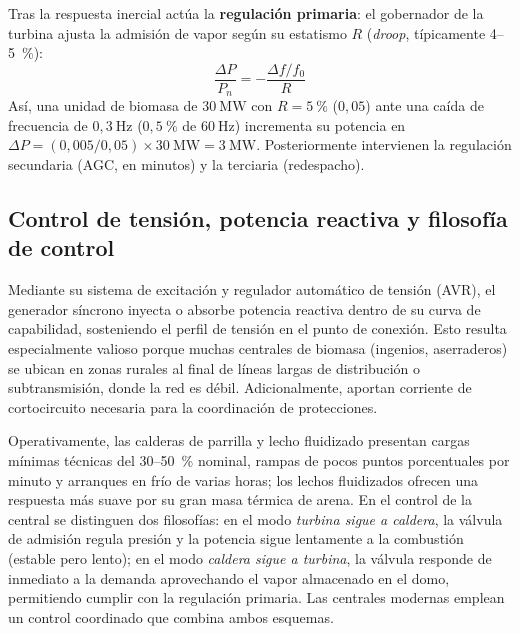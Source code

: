 Tras la respuesta inercial actúa la \textbf{regulación primaria}: el gobernador de la turbina ajusta la admisión de vapor según su estatismo $R$ (\textit{droop}, típicamente 4--5~\%):
\begin{equation}
\frac{\Delta P}{P_n} = -\frac{\Delta f / f_0}{R}
\end{equation}
Así, una unidad de biomasa de $30~\text{MW}$ con $R = 5~\%$ ($0{,}05$) ante una caída de frecuencia de $0{,}3~\text{Hz}$ ($0{,}5~\%$ de $60~\text{Hz}$) incrementa su potencia en $\Delta P = (0{,}005 / 0{,}05) \times 30~\text{MW} = 3~\text{MW}$. Posteriormente intervienen la regulación secundaria (AGC, en minutos) y la terciaria (redespacho).

\subsection{Control de tensión, potencia reactiva y filosofía de control}
Mediante su sistema de excitación y regulador automático de tensión (AVR), el generador síncrono inyecta o absorbe potencia reactiva dentro de su curva de capabilidad, sosteniendo el perfil de tensión en el punto de conexión. Esto resulta especialmente valioso porque muchas centrales de biomasa (ingenios, aserraderos) se ubican en zonas rurales al final de líneas largas de distribución o subtransmisión, donde la red es débil. Adicionalmente, aportan corriente de cortocircuito necesaria para la coordinación de protecciones.

Operativamente, las calderas de parrilla y lecho fluidizado presentan cargas mínimas técnicas del 30--50~\% nominal, rampas de pocos puntos porcentuales por minuto y arranques en frío de varias horas; los lechos fluidizados ofrecen una respuesta más suave por su gran masa térmica de arena. En el control de la central se distinguen dos filosofías: en el modo \textit{turbina sigue a caldera}, la válvula de admisión regula presión y la potencia sigue lentamente a la combustión (estable pero lento); en el modo \textit{caldera sigue a turbina}, la válvula responde de inmediato a la demanda aprovechando el vapor almacenado en el domo, permitiendo cumplir con la regulación primaria. Las centrales modernas emplean un control coordinado que combina ambos esquemas.

